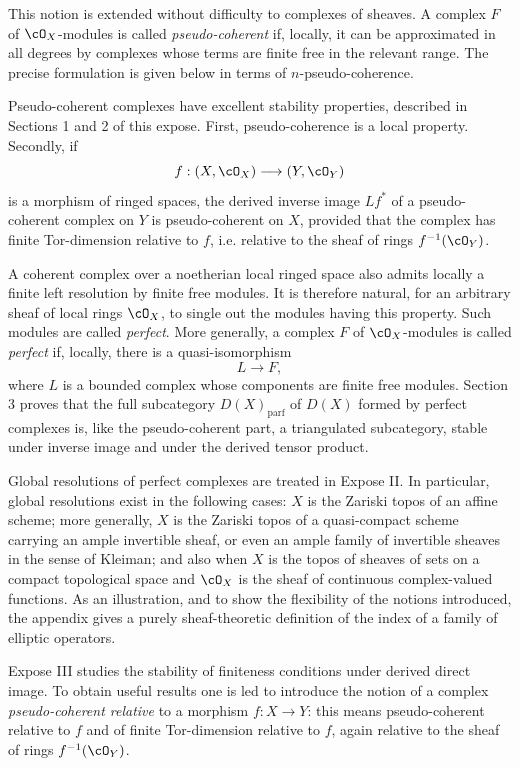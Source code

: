 \documentclass[11pt]{article}
\theoremstyle{plain}
\theoremstyle{definition}
\theoremstyle{remark}
\begin{document}
This notion is extended without difficulty to complexes of sheaves. A complex $F$ of $\cO_X$-modules is called \emph{pseudo-coherent} if, locally, it can be approximated in all degrees by complexes whose terms are finite free in the relevant range. The precise formulation is given below in terms of $n$-pseudo-coherence.

Pseudo-coherent complexes have excellent stability properties, described in Sections 1 and 2 of this expose. First, pseudo-coherence is a local property. Secondly, if
\[
   f:(X,\cO_X)\longrightarrow(Y,\cO_Y)
\]
is a morphism of ringed spaces, the derived inverse image $Lf^*$ of a pseudo-coherent complex on $Y$ is pseudo-coherent on $X$, provided that the complex has finite Tor-dimension relative to $f$, i.e. relative to the sheaf of rings $f^{-1}(\cO_Y)$.

A coherent complex over a noetherian local ringed space also admits locally a finite left resolution by finite free modules. It is therefore natural, for an arbitrary sheaf of local rings $\cO_X$, to single out the modules having this property. Such modules are called \emph{perfect}. More generally, a complex $F$ of $\cO_X$-modules is called \emph{perfect} if, locally, there is a quasi-isomorphism
\[
   L\longrightarrow F,
\]
where $L$ is a bounded complex whose components are finite free modules. Section 3 proves that the full subcategory $D(X)_{\mathrm{parf}}$ of $D(X)$ formed by perfect complexes is, like the pseudo-coherent part, a triangulated subcategory, stable under inverse image and under the derived tensor product.

Global resolutions of perfect complexes are treated in Expose II. In particular, global resolutions exist in the following cases: $X$ is the Zariski topos of an affine scheme; more generally, $X$ is the Zariski topos of a quasi-compact scheme carrying an ample invertible sheaf, or even an ample family of invertible sheaves in the sense of Kleiman; and also when $X$ is the topos of sheaves of sets on a compact topological space and $\cO_X$ is the sheaf of continuous complex-valued functions. As an illustration, and to show the flexibility of the notions introduced, the appendix gives a purely sheaf-theoretic definition of the index of a family of elliptic operators.

Expose III studies the stability of finiteness conditions under derived direct image. To obtain useful results one is led to introduce the notion of a complex \emph{pseudo-coherent relative} to a morphism $f:X\to Y$: this means pseudo-coherent relative to $f$ and of finite Tor-dimension relative to $f$, again relative to the sheaf of rings $f^{-1}(\cO_Y)$.
\end{document}

